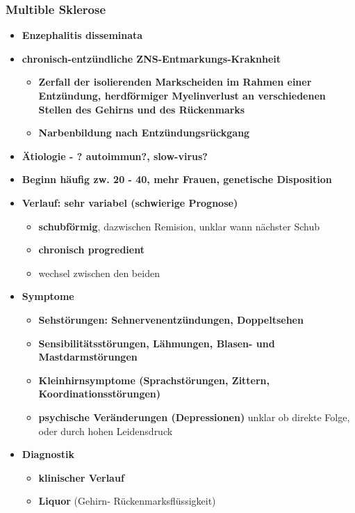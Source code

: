 	\subsubsection{Multible Sklerose}
		\begin{itemize}
			\item \textbf{Enzephalitis disseminata}
			\item \textbf{chronisch-entzündliche ZNS-Entmarkungs-Kraknheit}
				\begin{itemize}
					\item \textbf{Zerfall der isolierenden Markscheiden im Rahmen einer Entzündung, herdförmiger Myelinverlust an verschiedenen Stellen des Gehirns und des Rückenmarks}
					\item \textbf{Narbenbildung nach Entzündungsrückgang}
				\end{itemize}
			\item \textbf{Ätiologie - ? autoimmun?, slow-virus?}
			\item \textbf{Beginn häufig zw. 20 - 40, mehr Frauen, genetische Disposition}
			\item \textbf{Verlauf: sehr variabel (schwierige Prognose)}
				\begin{itemize}
					\item \textbf{schubförmig}, dazwischen Remision, unklar wann nächster Schub
					\item \textbf{chronisch progredient}
					\item wechsel zwischen den beiden
				\end{itemize}
			\item \textbf{Symptome}
				\begin{itemize}
					\item \textbf{Sehstörungen: Sehnervenentzündungen, Doppeltsehen}
					\item \textbf{Sensibilitätsstörungen, Lähmungen, Blasen- und Mastdarmstörungen}
					\item \textbf{Kleinhirnsymptome (Sprachstörungen, Zittern, Koordinationsstörungen)}
					\item \textbf{psychische Veränderungen (Depressionen)} unklar ob direkte Folge, oder durch hohen Leidensdruck
				\end{itemize}
			\item \textbf{Diagnostik}
				\begin{itemize}
					\item \textbf{klinischer Verlauf}
					\item \textbf{Liquor} (Gehirn- Rückenmarksflüssigkeit)

\end{itemize}
\end{itemize}
